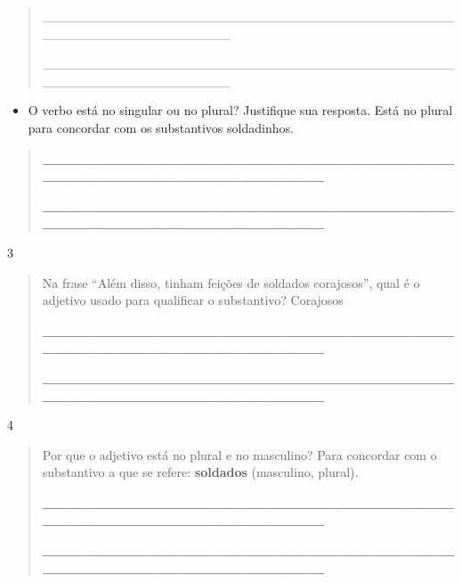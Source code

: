 \begin{itemize}
{{{\begin{itemize}
\begin{itemize}
\begin{itemize}
\begin{quote}
\_\_\_\_\_\_\_\_\_\_\_\_\_\_\_\_\_\_\_\_\_\_\_\_\_\_\_\_\_\_\_\_\_\_\_\_\_\_\_\_\_\_\_\_\_\_\_\_\_\_\_\_\_\_\_\_\_\_\_\_\_\_\_\_

\_\_\_\_\_\_\_\_\_\_\_\_\_\_\_\_\_\_\_\_\_\_\_\_\_\_\_\_\_\_\_\_\_\_\_\_\_\_\_\_\_\_\_\_\_\_\_\_\_\_\_\_\_\_\_\_\_\_\_\_\_\_\_\_
\end{quote}

\begin{itemize}
\item
  O verbo está no singular ou no plural? Justifique sua resposta. Está
  no plural para concordar com os substantivos soldadinhos.
\end{itemize}

\begin{quote}
\textbf{\_\_\_\_\_\_\_\_\_\_\_\_\_\_\_\_\_\_\_\_\_\_\_\_\_\_\_\_\_\_\_\_\_\_\_\_\_\_\_\_\_\_\_\_\_\_\_\_\_\_\_\_\_\_\_\_\_\_\_\_\_\_\_\_}

\textbf{\_\_\_\_\_\_\_\_\_\_\_\_\_\_\_\_\_\_\_\_\_\_\_\_\_\_\_\_\_\_\_\_\_\_\_\_\_\_\_\_\_\_\_\_\_\_\_\_\_\_\_\_\_\_\_\_\_\_\_\_\_\_\_\_}
\end{quote}

\num{3}

\begin{quote}
Na frase ``Além disso, tinham feições de soldados corajosos'', qual é o
adjetivo usado para qualificar o substantivo? Corajosos

\textbf{\_\_\_\_\_\_\_\_\_\_\_\_\_\_\_\_\_\_\_\_\_\_\_\_\_\_\_\_\_\_\_\_\_\_\_\_\_\_\_\_\_\_\_\_\_\_\_\_\_\_\_\_\_\_\_\_\_\_\_\_\_\_\_\_}

\textbf{\_\_\_\_\_\_\_\_\_\_\_\_\_\_\_\_\_\_\_\_\_\_\_\_\_\_\_\_\_\_\_\_\_\_\_\_\_\_\_\_\_\_\_\_\_\_\_\_\_\_\_\_\_\_\_\_\_\_\_\_\_\_\_\_}
\end{quote}

\num{4}

\begin{quote}
Por que o adjetivo está no plural e no masculino? Para concordar com o
substantivo a que se refere: \textbf{soldados} (masculino, plural).

\protect\hypertarget{_Hlk129593544}{}{}\textbf{\_\_\_\_\_\_\_\_\_\_\_\_\_\_\_\_\_\_\_\_\_\_\_\_\_\_\_\_\_\_\_\_\_\_\_\_\_\_\_\_\_\_\_\_\_\_\_\_\_\_\_\_\_\_\_\_\_\_\_\_\_\_\_\_}

\textbf{\_\_\_\_\_\_\_\_\_\_\_\_\_\_\_\_\_\_\_\_\_\_\_\_\_\_\_\_\_\_\_\_\_\_\_\_\_\_\_\_\_\_\_\_\_\_\_\_\_\_\_\_\_\_\_\_\_\_\_\_\_\_\_\_}
\end{quote}


\end{itemize}
\end{itemize}
\end{itemize}}}}
\end{itemize}

